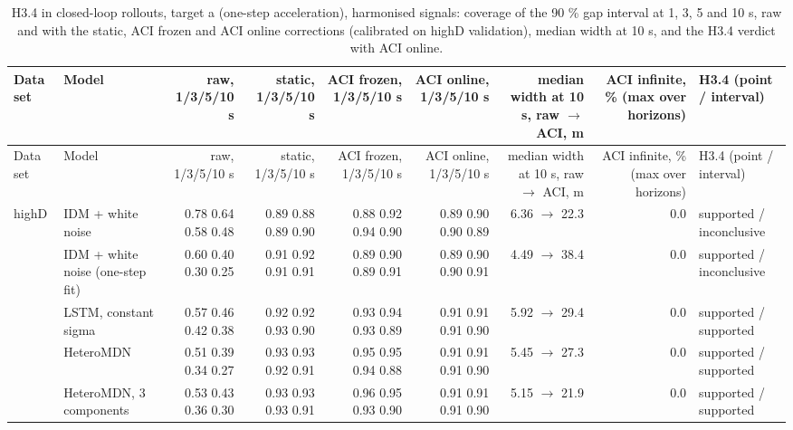 \begingroup
\footnotesize
\begin{longtable}{llrrrrrrl}
\caption{H3.4 in closed-loop rollouts, target a (one-step acceleration), harmonised signals: coverage of the 90 \% gap interval at 1, 3, 5 and 10 s, raw and with the static, ACI frozen and ACI online corrections (calibrated on highD validation), median width at 10 s, and the H3.4 verdict with ACI online.}\label{tab:t4-coverage--harmonised--a} \\
\toprule
Data set & Model & raw, 1/3/5/10 s & static, 1/3/5/10 s & ACI frozen, 1/3/5/10 s & ACI online, 1/3/5/10 s & median width at 10 s, raw $\rightarrow$ ACI, m & ACI infinite, \% (max over horizons) & H3.4 (point / interval) \\
\midrule
\endfirsthead
\toprule
Data set & Model & raw, 1/3/5/10 s & static, 1/3/5/10 s & ACI frozen, 1/3/5/10 s & ACI online, 1/3/5/10 s & median width at 10 s, raw $\rightarrow$ ACI, m & ACI infinite, \% (max over horizons) & H3.4 (point / interval) \\
\midrule
\endhead
\bottomrule
\endlastfoot
highD & IDM + white noise & 0.78 0.64 0.58 0.48 & 0.89 0.88 0.89 0.90 & 0.88 0.92 0.94 0.90 & 0.89 0.90 0.90 0.89 & 6.36 $\rightarrow$ 22.3 & 0.0 & supported / inconclusive \\
 & IDM + white noise (one-step fit) & 0.60 0.40 0.30 0.25 & 0.91 0.92 0.91 0.91 & 0.89 0.90 0.89 0.91 & 0.89 0.90 0.90 0.91 & 4.49 $\rightarrow$ 38.4 & 0.0 & supported / inconclusive \\
 & LSTM, constant sigma & 0.57 0.46 0.42 0.38 & 0.92 0.92 0.93 0.90 & 0.93 0.94 0.93 0.89 & 0.91 0.91 0.91 0.90 & 5.92 $\rightarrow$ 29.4 & 0.0 & supported / supported \\
 & HeteroMDN & 0.51 0.39 0.34 0.27 & 0.93 0.93 0.92 0.91 & 0.95 0.95 0.94 0.88 & 0.91 0.91 0.91 0.90 & 5.45 $\rightarrow$ 27.3 & 0.0 & supported / supported \\
 & HeteroMDN, 3 components & 0.53 0.43 0.36 0.30 & 0.93 0.93 0.93 0.91 & 0.96 0.95 0.93 0.90 & 0.91 0.91 0.91 0.90 & 5.15 $\rightarrow$ 21.9 & 0.0 & supported / supported \\

\end{longtable}

